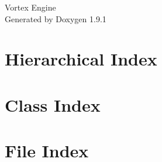 \let\mypdfximage\pdfximage\def\pdfximage{\immediate\mypdfximage}\documentclass[twoside]{book}
\newcommand{\+}{\discretionary{\mbox{\scriptsize$\hookleftarrow$}}{}{}}
\newcommand{\clearemptydoublepage}{%
  \newpage{\pagestyle{empty}\cleardoublepage}%
}
\begin{document}
\raggedbottom

\hypersetup{pageanchor=false,
             bookmarksnumbered=true,
             pdfencoding=unicode
            }
\begin{titlepage}
\vspace*{7cm}
\begin{center}%
{\Large Vortex Engine }\\
\vspace*{1cm}
{\large Generated by Doxygen 1.9.1}\\
\end{center}
\end{titlepage}
\clearemptydoublepage
{}
\tableofcontents
\clearemptydoublepage
{}
\hypersetup{pageanchor=true}

\chapter{Hierarchical Index}

\chapter{Class Index}

\chapter{File Index}

\end{document}
